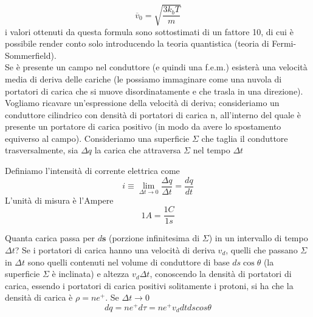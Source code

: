 \documentclass[
10pt, %
a4paper, %
oneside, %
headinclude,footinclude, %
BCOR5mm, %
]{scrartcl}
\begin{document}
\[\overline{v}_0=\sqrt{\frac{3k_b T}{m}}\]
i valori ottenuti da questa formula sono sottostimati di un fattore 10, di cui è possibile render conto solo introducendo la teoria quantistica (teoria di Fermi-Sommerfield).\\
Se è presente un campo nel conduttore (e quindi una f.e.m.) esisterà una velocità media di deriva delle cariche (le possiamo immaginare come una nuvola di portatori di carica che si muove disordinatamente e che trasla in una direzione). Vogliamo ricavare un'espressione della velocità di deriva; consideriamo un conduttore cilindrico con densità di portatori di carica n, all'interno del quale è presente un portatore di carica positivo (in modo da avere lo spostamento equiverso al campo). Consideriamo una superficie \(\Sigma\) che taglia il conduttore trasversalmente, sia $\Delta q$ la carica che attraversa $\Sigma$ nel tempo $\Delta t$
\begin{definizione}
	Definiamo l'intensità di corrente elettrica come
	\[i \equiv \lim_{\Delta t \to 0} \frac{\Delta q}{\Delta t}=\frac{dq}{dt}\]
	L'unità di misura è l'Ampere
	\[1 A = \frac{1 C}{1 s}\]
\end{definizione}
Quanta carica passa per \(d\mathbf{s}\) (porzione infinitesima di $\Sigma$) in un intervallo di tempo $\Delta t$? Se i portatori di carica hanno una velocità di deriva \(v_d\), quelli che passano $\Sigma$ in $\Delta t$ sono quelli contenuti nel volume di conduttore di base \(ds\cos\theta\) (la superficie $\Sigma$ è inclinata) e altezza $v_d\Delta t$, conoscendo la densità di portatori di carica, essendo i portatori di carica positivi solitamente i protoni, si ha che la densità di carica è \(\rho = n e^+\). Se $\Delta t \to 0$
\[dq = n e^+ d\tau = n e^+ v_d dt ds cos\theta\]
\end{document}
